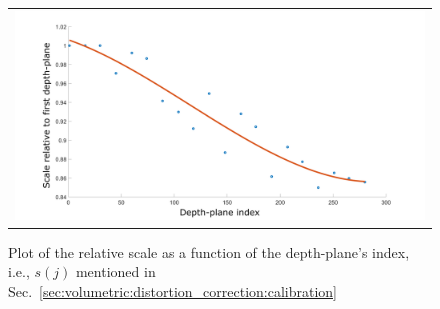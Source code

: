 \begin{figure} [ht]
\begin{center}
\begin{tabular}{c} 
\includegraphics[width=\textwidth]{images/volumetric/distortion_correction/scale_v_depth}
\end{tabular}
\end{center}
\label{fig:volumetric:distortion_correction:scale_v_depth} 
\caption[Volumetric NED: Relative scale as a function of depth]{Plot of the relative scale as a function of the depth-plane's index, i.e., $s(j)$ mentioned in Sec.~\ref{sec:volumetric:distortion_correction:calibration}}
\end{figure} 
